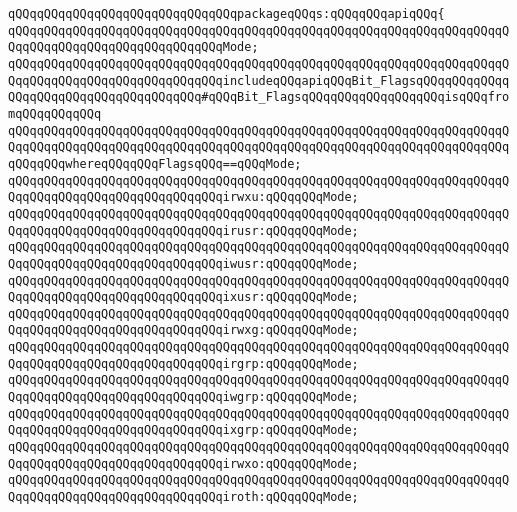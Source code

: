 \newline
\verb|qQQqqQQqqQQqqQQqqQQqqQQqqQQqqQQqpackageqQQqs:qQQqqQQqapiqQQq{|\newline
\verb|qQQqqQQqqQQqqQQqqQQqqQQqqQQqqQQqqQQqqQQqqQQqqQQqqQQqqQQqqQQqqQQqqQQqqQQqqQQqqQQqqQQqqQQqqQQqqQQqqQQqMode;|\newline
\verb|qQQqqQQqqQQqqQQqqQQqqQQqqQQqqQQqqQQqqQQqqQQqqQQqqQQqqQQqqQQqqQQqqQQqqQQqqQQqqQQqqQQqqQQqqQQqqQQqqQQqincludeqQQqapiqQQqBit_FlagsqQQqqQQqqQQqqQQqqQQqqQQqqQQqqQQqqQQqqQQq#qQQqBit_FlagsqQQqqQQqqQQqqQQqqQQqisqQQqfromqQQqqQQqqQQq|\newline
\verb|qQQqqQQqqQQqqQQqqQQqqQQqqQQqqQQqqQQqqQQqqQQqqQQqqQQqqQQqqQQqqQQqqQQqqQQqqQQqqQQqqQQqqQQqqQQqqQQqqQQqqQQqqQQqqQQqqQQqqQQqqQQqqQQqqQQqqQQqqQQqqQQqqQQqwhereqQQqqQQqFlagsqQQq==qQQqMode;|\newline
\newline
\verb|qQQqqQQqqQQqqQQqqQQqqQQqqQQqqQQqqQQqqQQqqQQqqQQqqQQqqQQqqQQqqQQqqQQqqQQqqQQqqQQqqQQqqQQqqQQqqQQqqQQqirwxu:qQQqqQQqMode;|\newline
\verb|qQQqqQQqqQQqqQQqqQQqqQQqqQQqqQQqqQQqqQQqqQQqqQQqqQQqqQQqqQQqqQQqqQQqqQQqqQQqqQQqqQQqqQQqqQQqqQQqqQQqirusr:qQQqqQQqMode;|\newline
\verb|qQQqqQQqqQQqqQQqqQQqqQQqqQQqqQQqqQQqqQQqqQQqqQQqqQQqqQQqqQQqqQQqqQQqqQQqqQQqqQQqqQQqqQQqqQQqqQQqqQQqiwusr:qQQqqQQqMode;|\newline
\verb|qQQqqQQqqQQqqQQqqQQqqQQqqQQqqQQqqQQqqQQqqQQqqQQqqQQqqQQqqQQqqQQqqQQqqQQqqQQqqQQqqQQqqQQqqQQqqQQqqQQqixusr:qQQqqQQqMode;|\newline
\verb|qQQqqQQqqQQqqQQqqQQqqQQqqQQqqQQqqQQqqQQqqQQqqQQqqQQqqQQqqQQqqQQqqQQqqQQqqQQqqQQqqQQqqQQqqQQqqQQqqQQqirwxg:qQQqqQQqMode;|\newline
\verb|qQQqqQQqqQQqqQQqqQQqqQQqqQQqqQQqqQQqqQQqqQQqqQQqqQQqqQQqqQQqqQQqqQQqqQQqqQQqqQQqqQQqqQQqqQQqqQQqqQQqirgrp:qQQqqQQqMode;|\newline
\verb|qQQqqQQqqQQqqQQqqQQqqQQqqQQqqQQqqQQqqQQqqQQqqQQqqQQqqQQqqQQqqQQqqQQqqQQqqQQqqQQqqQQqqQQqqQQqqQQqqQQqiwgrp:qQQqqQQqMode;|\newline
\verb|qQQqqQQqqQQqqQQqqQQqqQQqqQQqqQQqqQQqqQQqqQQqqQQqqQQqqQQqqQQqqQQqqQQqqQQqqQQqqQQqqQQqqQQqqQQqqQQqqQQqixgrp:qQQqqQQqMode;|\newline
\verb|qQQqqQQqqQQqqQQqqQQqqQQqqQQqqQQqqQQqqQQqqQQqqQQqqQQqqQQqqQQqqQQqqQQqqQQqqQQqqQQqqQQqqQQqqQQqqQQqqQQqirwxo:qQQqqQQqMode;|\newline
\verb|qQQqqQQqqQQqqQQqqQQqqQQqqQQqqQQqqQQqqQQqqQQqqQQqqQQqqQQqqQQqqQQqqQQqqQQqqQQqqQQqqQQqqQQqqQQqqQQqqQQqiroth:qQQqqQQqMode;|\newline
